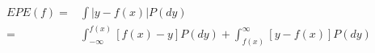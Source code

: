 \message{ !name(hw1_resp.tex)}\documentclass{amsart}
\begin{document}
\begin{align*}
  EPE(f) = & \int |y - f(x)| P(dy) \\
  = & \int_{-\infty}^{f(x)} [f(x) - y] P(dy) + \int_{f(x)}^{\infty} [y - f(x)] P(dy)
\end{align*}
\end{document}
